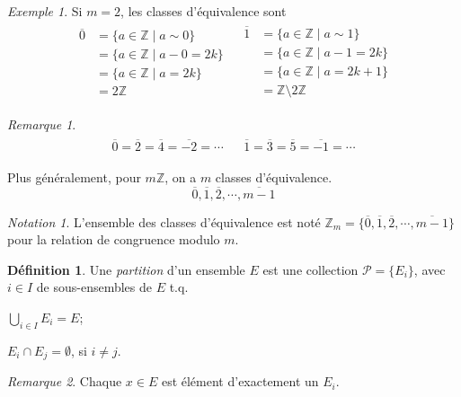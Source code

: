 \documentclass{report}
\newcommand*{\entiers}{\mathbb{Z}}
\theoremstyle{definition}
\newtheorem*{defin}{D\'efinition}
\theoremstyle{remark}
\newtheorem*{exem}{Exemple}
\newtheorem*{nota}{Notation}
\newtheorem*{rema}{Remarque}
\begin{document}
\begin{exem}
		Si $m=2$, les classes d'\'equivalence sont
		\begin{align*}
			\begin{split}
				\overline{0}&= \{a \in \entiers \mid a \sim 0\}\\
				&= \{a \in \entiers \mid a-0=2k\}\\
				&= \{a \in \entiers \mid a=2k\}\\
				&= 2\entiers
			\end{split}
			&
			\begin{split}
				\overline{1}&= \{a \in \entiers \mid a \sim 1\}\\
				&= \{a \in \entiers \mid a-1=2k\}\\
				&= \{a \in \entiers \mid a=2k+1\}\\
				&= \entiers\setminus2\entiers
			\end{split}
		\end{align*}
		\begin{rema}
			\begin{align*}
				\begin{split}
					\overline{0} = \overline{2} = \overline{4} = \overline{-2} = \dotsb
				\end{split}
				&
				\begin{split}
					\overline{1} = \overline{3} = \overline{5} = \overline{-1} = \dotsb
				\end{split}
			\end{align*}
		\end{rema}

		Plus g\'en\'eralement, pour $m\entiers$, on a $m$ classes d'\'equivalence.
		\[
		\overline{0}, \overline1, \overline2, \dotsb, \overline{m-1}
		\]
		\begin{nota}
			L'ensemble des classes d'\'equivalence est not\'e $\entiers_m = \{\overline{0}, \overline1, \overline2, \dotsb, \overline{m-1}\}$ pour la relation de congruence modulo $m$.
		\end{nota}
	\end{exem}
	\begin{defin}
		Une \emph{partition} d'un ensemble $E$ est une collection $\mathcal{P} = \{E_i\}$, avec $i \in I$ de sous-ensembles de $E$ t.q.
		\begin{nlist}
			\item $\bigcup\limits_{i \in I} E_i = E$;
			\item $E_i \cap E_j = \emptyset$, si $i \neq j$.
		\end{nlist}
		\begin{rema}
			Chaque $x \in E$ est \'el\'ement d'exactement un $E_i$.
		\end{rema}
	\end{defin}
\end{document}
